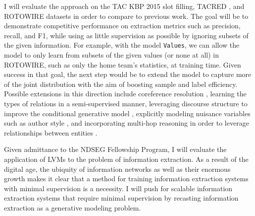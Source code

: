\documentclass[12pt]{article}
\begin{document}
I will evaluate the approach on the 
TAC KBP 2015 slot filling, TACRED \citep{zhang2017slotfilling},
and ROTOWIRE \citep{wiseman2017d2t} datasets in order to compare to previous work.
The goal will be to demonstrate competitive performance on
extraction metrics such as precision, recall, and F1, while using as little supervision
as possible by ignoring subsets of the given information.
For example, with the model \texttt{Values}, we can allow the model to only learn from
subsets of the given values (or none at all) in ROTOWIRE, such as only
the home team's statistics, at training time.
Given success in that goal, the next step would be to extend the model
to capture more of the joint distribution with the aim of boosting sample and label efficiency.
Possible extensions in this direction include coreference resolution \citep{haghighi2010coref},
learning the types of relations in a semi-supervised manner,
leveraging discourse structure to improve the conditional generative model
\citep{sauper2009wiki}, explicitly modeling nuisance variables such as
author style \citep{hsu2017speech}, and incorporating multi-hop
reasoning in order to leverage relationships between entities
\citep{chen2018diva,rock17prove}.

Given admittance to the NDSEG Fellowship Program, I will evaluate the application of
LVMs to the problem of information extraction.
As a result of the digital age, the ubiquity of information networks as well as their 
enormous growth makes it clear that a method for training information extraction systems
with minimal supervision is a necessity.
I will push for scalable information extraction systems that require minimal supervision
by recasting information extraction as a generative modeling problem.

\newpage
\end{document}

